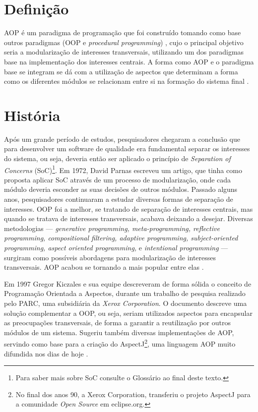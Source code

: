 \documentclass[tc,openright]{iiufrgs}
\begin{document}
\section{Definição}
AOP é um paradigma de programação que foi construído tomando como base outros paradigmas (OOP e \textit{procedural programming}) , cujo o principal objetivo seria a modularização de interesses transversais, utilizando um dos paradigmas base na implementação dos interesses centrais. A forma como AOP e o paradigma base se integram se dá com a utilização de aspectos que determinam a forma como os diferentes módulos se relacionam entre si na formação do sistema final \cite{laddad2003aspectj}.
\section{História}
Após um grande período de estudos, pesquisadores chegaram a conclusão que para desenvolver um software de qualidade era fundamental separar os interesses do sistema, ou seja, deveria então ser aplicado o princípio de \textit{Separation of Concerns} (SoC)\footnote{Para saber mais sobre SoC consulte o Glossário ao final deste texto.}. Em 1972, David Parnas escreveu um artigo, que tinha como  proposta aplicar SoC através de um processo de modularização, onde cada módulo deveria esconder as suas decisões de outros módulos. Passado alguns anos, pesquisadores continuaram a estudar diversas formas de separação de interesses. OOP foi a melhor, se tratando de separação de interesses centrais, mas quando se tratava de interesses transversais, acabava deixando a desejar. Diversas metodologias — \textit{generative programming, meta-programming, reflective programming, compositional filtering, adaptive programming, subject-oriented programming, aspect oriented programming,} e  \textit{intentional programming} — surgiram como possíveis abordagens para modularização de interesses transversais. AOP acabou se tornando a mais popular entre elas \cite{laddad2003aspectj}.

Em 1997 Gregor Kiczales e sua equipe descreveram de forma sólida o conceito de Programação Orientada a Aspectos, durante um trabalho de pesquisa realizado pelo PARC, uma subsidiária da \textit{Xerox Corporation}. O documento descreve uma solução complementar a OOP, ou seja, seriam utilizados aspectos para encapsular as preocupações transversais, de forma a garantir a reutilização por outros módulos de um sistema. Sugeriu também diversas implementações de AOP, servindo como base para a criação do AspectJ\footnote{No final dos anos 90, a Xerox Corporation, transferiu o projeto AspectJ para a comunidade \textit{Open Source} em eclipse.org.}, uma linguagem AOP muito difundida nos dias de hoje \cite{groves2013aop}.
\end{document}

